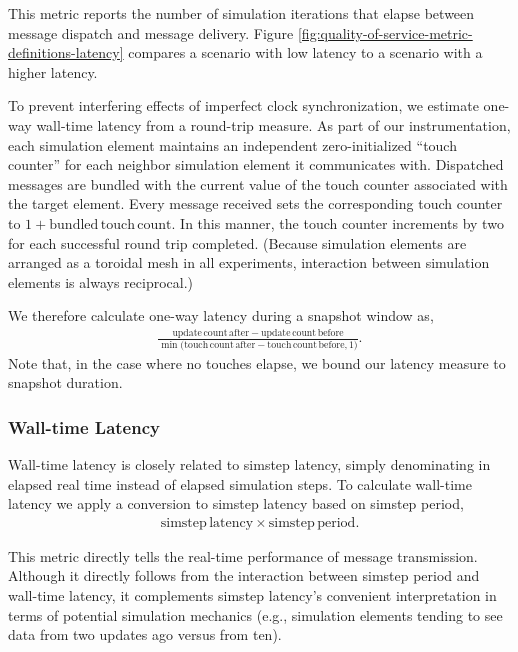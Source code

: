 This metric reports the number of simulation iterations that elapse between message dispatch and message delivery.
Figure \ref{fig:quality-of-service-metric-definitions-latency} compares a scenario with low latency to a scenario with a higher latency.

To prevent interfering effects of imperfect clock synchronization, we estimate one-way wall-time latency from a round-trip measure.
As part of our instrumentation, each simulation element maintains an independent zero-initialized ``touch counter'' for each neighbor simulation element it communicates with.
Dispatched messages are bundled with the current value of the touch counter associated with the target element.
Every message received sets the corresponding touch counter to $1 + \mathrm{bundled\,touch\,count}$.
In this manner, the touch counter increments by two for each successful round trip completed.
(Because simulation elements are arranged as a toroidal mesh in all experiments, interaction between simulation elements is always reciprocal.)

We therefore calculate one-way latency during a snapshot window as,
\begin{align*}
  \frac{
    \mathrm{update\,count\,after} - \mathrm{update\,count\,before}
  }{
    \min\Big( \mathrm{ touch\,count\,after } - \mathrm{ touch\,count\,before }, 1 \Big)
  }.
\end{align*}
Note that, in the case where no touches elapse, we bound our latency measure to snapshot duration.


\subsubsection{Wall-time Latency} \label{sec:simulation-time-latency-metric}

Wall-time latency is closely related to simstep latency, simply denominating in elapsed real time instead of elapsed simulation steps.
To calculate wall-time latency we apply a conversion to simstep latency based on simstep period,
\begin{align*}
  \mathrm{simstep\,latency} \times \mathrm{simstep\,period}.
\end{align*}

This metric directly tells the real-time performance of message transmission.
Although it directly follows from the interaction between simstep period and wall-time latency, it complements simstep latency's convenient interpretation in terms of potential simulation mechanics (e.g., simulation elements tending to see data from two updates ago versus from ten).


